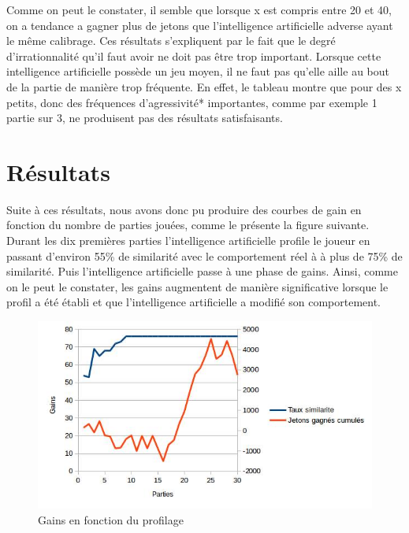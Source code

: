 \documentclass{report}
\begin{document}
Comme on peut le constater, il semble que lorsque x est compris entre 20 et 40, on a tendance a gagner plus de jetons que l'intelligence artificielle adverse ayant le même calibrage. Ces résultats s'expliquent par le fait que le degré d'irrationnalité qu'il faut avoir ne doit pas être trop important. Lorsque cette intelligence artificielle possède un jeu moyen, il ne faut pas qu'elle aille au bout de la partie de manière trop fréquente. En effet, le tableau montre que pour des x petits, donc des fréquences d'agressivité* importantes, comme par exemple 1 partie sur 3, ne produisent pas des résultats satisfaisants.

\section{Résultats}
\hspace{0.5cm}Suite à ces résultats, nous avons donc pu produire des courbes de gain en fonction du nombre de parties jouées, comme le présente la figure suivante. Durant les dix premières parties l'intelligence artificielle profile le joueur en passant d'environ 55\% de similarité avec le comportement réel à à plus de 75\% de similarité. Puis l'intelligence artificielle passe à une phase de gains. Ainsi, comme on le peut le constater, les gains augmentent de manière significative lorsque le profil a été établi et que l'intelligence artificielle a modifié son comportement.\\

\begin{figure}[H]
	\begin{center}
		\includegraphics[scale=0.5]{./imagesRapport/tauxSimilariteGains.jpg}
	\end{center}
	\caption{Gains en fonction du profilage}
\end{figure}
\end{document}
